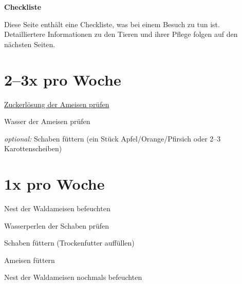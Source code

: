 \begin{center}
  \Huge{\textbf{Checkliste}}
\end{center}
Diese Seite enthält eine Checkliste, was bei einem Besuch zu tun ist.
Detailliertere Informationen zu den Tieren und ihrer Pflege folgen auf den nächsten Seiten.

\section*{2--3x pro Woche}
\begin{todolist}
  \item \hyperref[sec:Ameisen_sub:Zucker]{Zuckerlösung der Ameisen prüfen}
  \item Wasser der Ameisen prüfen
  \item \textit{optional:} Schaben füttern (ein Stück Apfel/Orange/Pfirsich oder 2--3 Karottenscheiben)
  \item
  \item
  \item
\end{todolist}

\section*{1x pro Woche}
\begin{todolist}
  \item Nest der Waldameisen befeuchten
  \item Wasserperlen der Schaben prüfen
  \item Schaben füttern (Trockenfutter auffüllen)
  \item Ameisen füttern
  \item
  \item
  \item
  \item Nest der Waldameisen nochmals befeuchten
\end{todolist}

